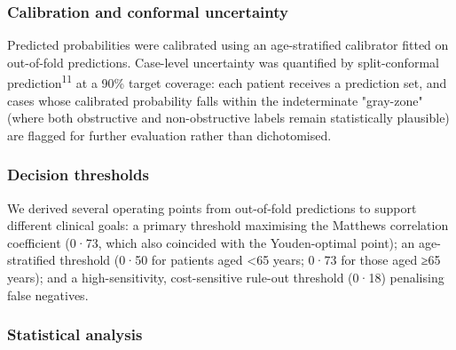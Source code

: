\documentclass[
  english,
  11pt,
]{article}
\begin{document}
\subsubsection{Calibration and conformal
uncertainty}\label{calibration-and-conformal-uncertainty}

Predicted probabilities were calibrated using an age-stratified
calibrator fitted on out-of-fold predictions. Case-level uncertainty was
quantified by split-conformal prediction\textsuperscript{11} at a 90\% target coverage: each
patient receives a prediction set, and cases whose calibrated
probability falls within the indeterminate "gray-zone" (where both
obstructive and non-obstructive labels remain statistically plausible)
are flagged for further evaluation rather than dichotomised.

\subsubsection{Decision thresholds}\label{decision-thresholds}

We derived several operating points from out-of-fold predictions to
support different clinical goals: a primary threshold maximising the
Matthews correlation coefficient (0·73, which also coincided with the
Youden-optimal point); an age-stratified threshold (0·50 for patients
aged \textless65 years; 0·73 for those aged ≥65 years); and a
high-sensitivity, cost-sensitive rule-out threshold (0·18) penalising
false negatives.

\subsubsection{Statistical analysis}\label{statistical-analysis}
\end{document}
